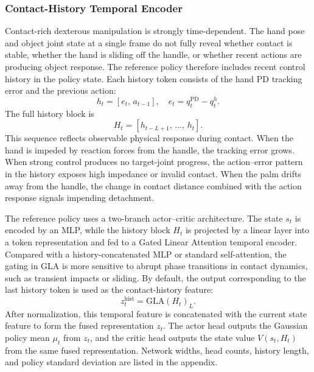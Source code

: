 \documentclass{llmxive}
\begin{document}
\subsubsection{Contact-History Temporal Encoder}
\label{sec:gla}

Contact-rich dexterous manipulation is strongly time-dependent. The
hand pose and object joint state at a single frame do not fully
reveal whether contact is stable, whether the hand is sliding off the
handle, or whether recent actions are producing object response. The
reference policy therefore includes recent control history in the
policy state. Each history token consists of the hand PD tracking
error and the previous action:
\begin{equation}
h_t = [e_t,\,a_{t-1}],\quad
e_t = q_t^{\mathrm{PD}} - q_t^h.
\label{eq:token}
\end{equation}
The full history block is
\begin{equation}
H_t = [h_{t-L+1},\,\ldots,\,h_t].
\label{eq:block}
\end{equation}
This sequence reflects observable physical response during contact.
When the hand is impeded by reaction forces from the handle, the
tracking error grows. When strong control produces no target-joint
progress, the action--error pattern in the history exposes high
impedance or invalid contact. When the palm drifts away from the
handle, the change in contact distance combined with the action
response signals impending detachment.

The reference policy uses a two-branch actor--critic architecture.
The state $s_t$ is encoded by an MLP, while the history block $H_t$
is projected by a linear layer into a token representation and fed
to a Gated Linear Attention temporal encoder. Compared with a
history-concatenated MLP or standard self-attention, the gating in
GLA is more sensitive to abrupt phase transitions in contact
dynamics, such as transient impacts or sliding. By default, the
output corresponding to the last history token is used as the
contact-history feature:
\begin{equation}
z_t^{\mathrm{hist}} = \mathrm{GLA}(H_t)_L.
\label{eq:zhist}
\end{equation}
After normalization, this temporal feature is concatenated with the
current state feature to form the fused representation $z_t$. The
actor head outputs the Gaussian policy mean $\mu_t$ from $z_t$, and
the critic head outputs the state value $V(s_t, H_t)$ from the same
fused representation. Network widths, head counts, history length,
and policy standard deviation are listed in the appendix.
\end{document}
